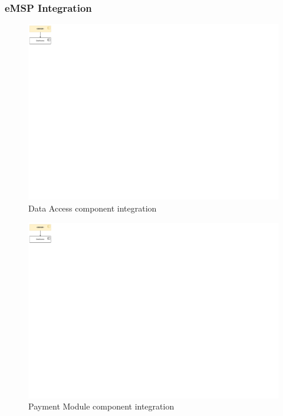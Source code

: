 \documentclass[11pt]{article}
\begin{document}
\subsubsection{eMSP Integration}

\begin{figure}[!ht]
    \centering
    \includegraphics[page={1}, trim=0cm 31cm 46cm 0cmm, clip]{IntegrationDiagram.pdf}
    \caption{Data Access component integration}
\end{figure}

\begin{figure}[!ht]
    \centering
    \includegraphics[page={2}, trim=0cm 31cm 46cm 0cmm, clip]{IntegrationDiagram.pdf}
    \caption{Payment Module component integration}
\end{figure}
\end{document}

